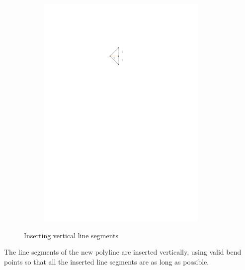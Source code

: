 \begin{figure}[H]
	\centering
	\begin{subfigure}{0.4\linewidth}
		\centering
		\includegraphics[width=0.9\textwidth,page=6]{drawings/maximal_planar.pdf}
	\end{subfigure}
	\caption{Inserting vertical line segments}\label{im:vertical_insertion}
\end{figure}
The line segments of the new polyline are inserted vertically, using valid bend points so that all the inserted line segments are as long as possible. 

